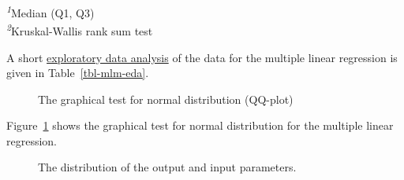 \documentclass[
  a4paper,
]{scrbook}
\begin{document}
\begin{minipage}{\linewidth}
\textsuperscript{\textit{1}}Median (Q1, Q3)\\
\textsuperscript{\textit{2}}Kruskal-Wallis rank sum test\\
\end{minipage}
\endgroup

A short \hyperref[eda]{exploratory data analysis} of the data for the
multiple linear regression is given in Table~\ref{tbl-mlm-eda}.

\begin{figure}[H]


\caption{\label{fig-mlm-qq-eda}The graphical test for normal
distribution (QQ-plot)}

\end{figure}%

Figure~\ref{fig-mlm-qq-eda} shows the graphical test for normal
distribution for the multiple linear regression.

\begin{figure}[H]


\caption{\label{fig-mlm-hist}The distribution of the output and input
parameters.}

\end{figure}%
\end{document}
